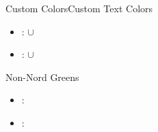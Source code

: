 \documentclass[\string~/GitHub/sthlmNordBeamerTheme/sthlmNordLightDemo.tex]{subfiles}
\begin{document}
\begin{frame}{Custom Colors}{Custom Text Colors}
\begin{itemize}
		\item  {}: \texttt{} \( \cup \) \texttt{}
		\item  {}: \texttt{} \( \cup \) \texttt{}
	\end{itemize}
	\framebreak
	{\Large{Non-Nord Greens}}
	\begin{itemize}
		\item {}: \texttt{}
		\item {}: \texttt{}
	\end{itemize}
\end{frame}
\end{document}

